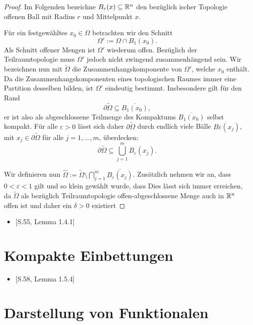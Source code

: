 \begin{proof}
Im Folgenden bezeichne $B_r(x) \subseteq \mathbb{R}^n$ den bezüglich \euklid ischer Topologie offenen Ball mit Radius $r$ und Mittelpunkt $x$.

  Für ein festgewähltes $x_0 \in \Omega$ betrachten wir den Schnitt 
  $$
  \Omega' := \Omega \cap B_1(x_0).$$ 
  Als Schnitt offener Mengen ist $\Omega'$ wiederum offen. 
  Bezüglich der Teilraumtopologie muss $\Omega'$ jedoch nicht zwingend zusammenhängend sein.
  Wir bezeichnen nun mit $\widetilde{\Omega}$ die Zusammenhangskomponente von $\Omega'$, welche $x_0$ enthält.
  Da die Zusammenhangskomponenten eines topologischen Raumes immer eine Partition desselben bilden, ist $\Omega'$ eindeutig bestimmt.
  Insbesondere gilt für den Rand
  $$ 
  \partial \widetilde\Omega \subseteq \overline{B_1(x_0)}, 
  $$
  er ist also als abgeschlossene Teilmenge des Kompaktums $\overline{B_1(x_0)}$ selbst kompakt.
  Für alle $\varepsilon > 0$ lässt sich daher $\partial \widetilde\Omega$ durch endlich viele Bälle $B\varepsilon(x_j)$, mit $x_j \in \partial \widetilde\Omega$ für alle $j = 1,\dots,m$, überdecken:
  $$ 
  \partial \widetilde\Omega \subseteq \bigcup_{j = 1}^m B_\varepsilon(x_j).
  $$

  Wir definieren nun $\widehat\Omega := \widetilde\Omega \setminus \bigcap_{j = 1}^m \overline{B_\varepsilon(x_j)}$.
  Zusätzlich nehmen wir an, dass $0 < \varepsilon < 1$ gilt und so klein gewählt wurde, dass 
  Dies lässt sich immer erreichen, da $\widetilde\Omega$ als bezüglich Teilraumtopologie offen-abgeschlossene Menge auch in $\mathbb{R}^n$ offen ist und daher ein $\delta > 0$ existiert
  
\end{proof}

\begin{itemize}
  \item \cite{sohr2001navier}[S.55, Lemma 1.4.1]
\end{itemize}

\newpage
\section{Kompakte Einbettungen}

\begin{itemize}
  \item \cite{sohr2001navier}[S.58, Lemma 1.5.4]
\end{itemize}

\newpage
\section{Darstellung von Funktionalen}


